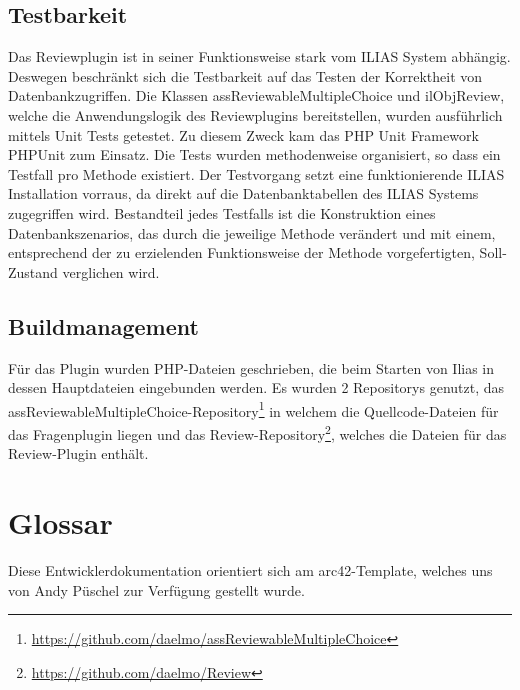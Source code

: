 \documentclass[a4paper]{scrreprt}
\begin{document}
\section{Testbarkeit}

Das Reviewplugin ist in seiner Funktionsweise stark vom ILIAS System abhängig. Deswegen beschränkt sich die Testbarkeit auf das Testen der Korrektheit von Datenbankzugriffen.
Die Klassen assReviewableMultipleChoice und ilObjReview, welche die Anwendungslogik des Reviewplugins bereitstellen, wurden ausführlich mittels Unit Tests getestet.
Zu diesem Zweck kam das PHP Unit Framework PHPUnit zum Einsatz. Die Tests wurden methodenweise organisiert, so dass ein Testfall pro Methode existiert.
Der Testvorgang setzt eine funktionierende ILIAS Installation vorraus, da direkt auf die Datenbanktabellen des ILIAS Systems zugegriffen wird.
Bestandteil jedes Testfalls ist die Konstruktion eines Datenbankszenarios, das durch die jeweilige Methode verändert und mit einem, entsprechend der zu erzielenden Funktionsweise der Methode vorgefertigten, Soll-Zustand verglichen wird.

\section{Buildmanagement}

Für das Plugin wurden PHP-Dateien geschrieben, die beim Starten von Ilias in dessen Hauptdateien eingebunden werden.
Es wurden 2 Repositorys genutzt, das assReviewableMultipleChoice-Repository\footnote{\url{https://github.com/daelmo/assReviewableMultipleChoice}} in welchem die Quellcode-Dateien für das Fragenplugin liegen und das Review-Repository\footnote{\url{https://github.com/daelmo/Review}}, welches die Dateien für das Review-Plugin enthält.

\chapter{Glossar}

Diese Entwicklerdokumentation orientiert sich am arc42-Template, welches uns von Andy Püschel zur Verfügung gestellt wurde.
\end{document}

